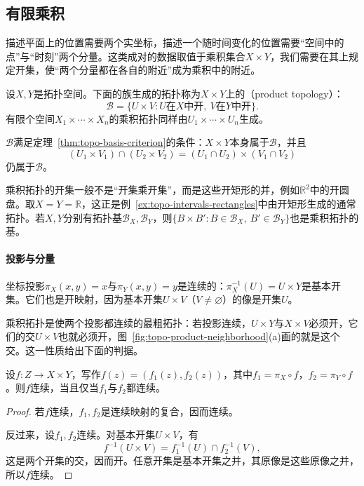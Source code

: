 \subsection{有限乘积}
\label{sec:topo-finite-products}

描述平面上的位置需要两个实坐标，描述一个随时间变化的位置需要“空间中的点”与“时刻”两个分量。这类成对的数据取值于乘积集合$X\times Y$，我们需要在其上规定开集，使“两个分量都在各自的附近”成为乘积中的附近。

\begin{definition}[乘积拓扑]
\label{def:topo-product}
设$X,Y$是拓扑空间。下面的族生成的拓扑称为$X\times Y$上的（product topology）：
\begin{equation}
 \mathcal B=\{U\times V:U\text{在}X\text{中开},\ V\text{在}Y\text{中开}\}.
 \label{eq:topo-product-basis}
\end{equation}
有限个空间$X_1\times\cdots\times X_n$的乘积拓扑同样由$U_1\times\cdots\times U_n$生成。
\end{definition}

$\mathcal B$满足定理~\ref{thm:topo-basis-criterion}的条件：$X\times Y$本身属于$\mathcal B$，并且
\[
 (U_1\times V_1)\cap(U_2\times V_2)=(U_1\cap U_2)\times(V_1\cap V_2)
\]
仍属于$\mathcal B$。

乘积拓扑的开集一般不是“开集乘开集”，而是这些开矩形的并，例如$\mathbb R^2$中的开圆盘。取$X=Y=\mathbb R$，这正是例~\ref{ex:topo-intervals-rectangles}中由开矩形生成的通常拓扑。若$X,Y$分别有拓扑基$\mathcal B_X,\mathcal B_Y$，则$\{B\times B':B\in\mathcal B_X,\ B'\in\mathcal B_Y\}$也是乘积拓扑的基。

\paragraph{投影与分量}
坐标投影$\pi_X(x,y)=x$与$\pi_Y(x,y)=y$是连续的：$\pi_X^{-1}(U)=U\times Y$是基本开集。它们也是开映射，因为基本开集$U\times V$（$V\neq\varnothing$）的像是开集$U$。

乘积拓扑是使两个投影都连续的最粗拓扑：若投影连续，$U\times Y$与$X\times V$必须开，它们的交$U\times V$也就必须开，图~\ref{fig:topo-product-neighborhood}(a)画的就是这个交。这一性质给出下面的判据。

\begin{theorem}[映入乘积的映射]
\label{thm:topo-map-into-product}
设$f:Z\to X\times Y$，写作$f(z)=(f_1(z),f_2(z))$，其中$f_1=\pi_X\circ f$，$f_2=\pi_Y\circ f$。则$f$连续，当且仅当$f_1$与$f_2$都连续。
\end{theorem}
\begin{proof}
若$f$连续，$f_1,f_2$是连续映射的复合，因而连续。

反过来，设$f_1,f_2$连续。对基本开集$U\times V$，有
\[
 f^{-1}(U\times V)=f_1^{-1}(U)\cap f_2^{-1}(V),
\]
这是两个开集的交，因而开。任意开集是基本开集之并，其原像是这些原像之并，所以$f$连续。
\end{proof}


